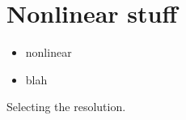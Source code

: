 %
% 
%
%
%
%
%
%
%
%
%
%
%
%
%
%
\chapter{Nonlinear stuff}

\begin{itemize}
\item nonlinear 
\item blah
\end{itemize}

Selecting the resolution. 
